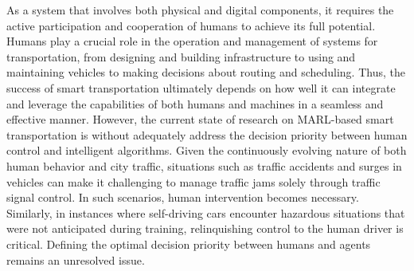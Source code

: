 \documentclass[acmsmall]{acmart}
\begin{document}
As a system that involves both physical and digital components, it requires the active participation and cooperation of humans to achieve its full potential. Humans play a crucial role in the operation and management of systems for transportation, from designing and building infrastructure to using and maintaining vehicles to making decisions about routing and scheduling. Thus, the success of smart transportation ultimately depends on how well it can integrate and leverage the capabilities of both humans and machines in a seamless and effective manner. However, the current state of research on MARL-based smart transportation is without adequately address the decision priority between human control and intelligent algorithms. Given the continuously evolving nature of both human behavior and city traffic, situations such as traffic accidents and surges in vehicles can make it challenging to manage traffic jams solely through traffic signal control. In such scenarios, human intervention becomes necessary. Similarly, in instances where self-driving cars encounter hazardous situations that were not anticipated during training, relinquishing control to the human driver is critical. Defining the optimal decision priority between humans and agents remains an unresolved issue.


\end{document}
